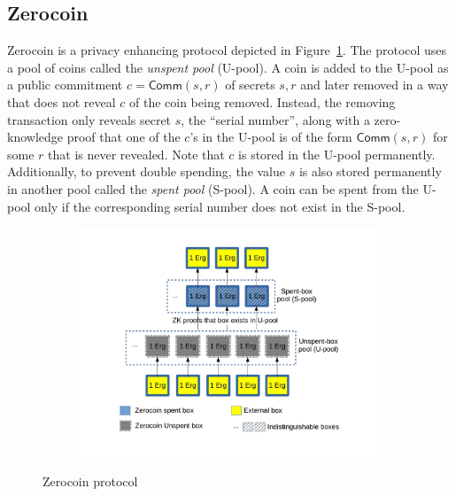\documentclass[runningheads]{llncs}
\newcommand{\zerocoin}{Zerocoin\xspace}
\begin{document}
\subsection{\zerocoin}
\label{zerocoin} 

\zerocoin is a privacy enhancing protocol 
depicted in Figure~\ref{fig:zerocoin}. The protocol 
uses a pool of coins called the {\em unspent pool} (U-pool). A coin is added to the U-pool as a public commitment $c = \mathsf{Comm}(s, r)$ of secrets $s, r$ and later removed in a way
that does not reveal $c$ of the coin being removed. Instead, the removing transaction only reveals secret $s$, the ``serial number'', along with a zero-knowledge proof that one of the $c$'s in the U-pool is of the form $\mathsf{Comm}(s, r)$ for some $r$ that is never revealed. Note that $c$ is stored in the U-pool permanently.
Additionally, to prevent double spending, the value $s$ is also stored permanently in another pool called the {\em spent pool} (S-pool). A coin can be spent from the U-pool only if the corresponding serial number does not exist in the S-pool. 

\begin{figure}[h]
	\centering
	\begin{subfigure}{.7\textwidth}
		\centering
		\includegraphics[width=\linewidth]{Zerocoin.jpg}
	\end{subfigure}
	\caption{\zerocoin protocol}
	\label{fig:zerocoin}
\end{figure}
\end{document}

